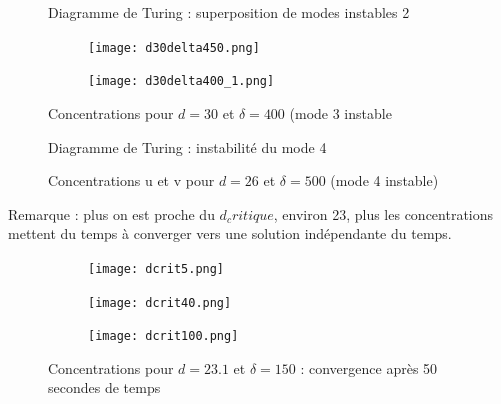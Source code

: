 \documentclass[12pt,a4paper]{article}
\begin{document}
\begin{figure}[h!]
\caption{Diagramme de Turing : superposition de modes instables 2}
\label{fig turing3}
\end{figure}
\begin{figure}[h!]
  \centering
  \begin{subfigure}[h]{0.4\linewidth}
    \texttt{[image: d30delta450.png]}
  \end{subfigure}
  \begin{subfigure}[h]{0.4\linewidth}
    \texttt{[image: d30delta400\_1.png]}
  \end{subfigure}
  \caption{Concentrations pour $d=30$ et $\delta=400$ (mode 3 instable}
  \label{fig concentration3}
\end{figure}


\begin{figure}[h!]
\caption{Diagramme de Turing : instabilit\'e du mode 4}
\label{fig turing1}
\end{figure}
\begin{figure}[h!]
\caption{Concentrations u et v pour $d=26$ et $\delta = 500$ (mode 4 instable)}
\label{fig concentration4}
\end{figure}
Remarque : plus on est proche du $d_critique$, environ 23, plus les concentrations mettent du temps \`a converger vers une solution ind\'ependante du temps.\\
\begin{figure}[h!]
  \centering
  \begin{subfigure}[h]{0.4\linewidth}
    \texttt{[image: dcrit5.png]}
  \end{subfigure}
  \begin{subfigure}[h]{0.4\linewidth}
    \texttt{[image: dcrit40.png]}
  \end{subfigure}
	  \begin{subfigure}[h]{0.4\linewidth}
    \texttt{[image: dcrit100.png]}
  \end{subfigure}
  \caption{Concentrations pour $d=23.1$ et $\delta=150$ : convergence apr\`es 50 secondes de temps}
  \label{fig dcrit_tps}
\end{figure}
\end{document}

